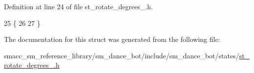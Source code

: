 Definition at line 24 of file st\+\_\+rotate\+\_\+degrees\+\_.\+h.


\begin{DoxyCode}
25   \{
26     
27   \}
\end{DoxyCode}


The documentation for this struct was generated from the following file\+:\begin{DoxyCompactItemize}
\item 
smacc\+\_\+sm\+\_\+reference\+\_\+library/sm\+\_\+dance\+\_\+bot/include/sm\+\_\+dance\+\_\+bot/states/\hyperlink{st__rotate__degrees__1_8h}{st\+\_\+rotate\+\_\+degrees\+\_.\+h}\end{DoxyCompactItemize}
